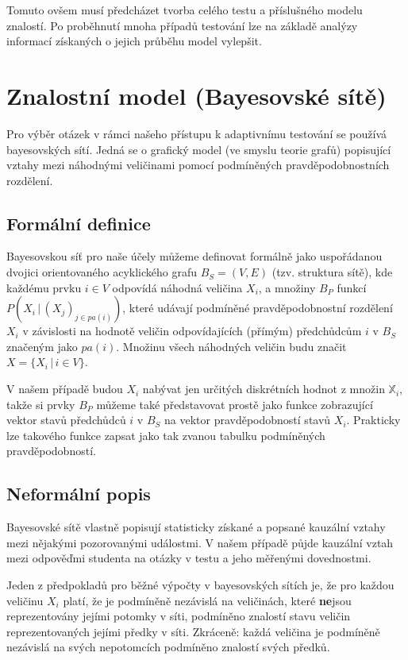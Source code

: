 \documentclass[a4paper,twoside,12pt]{book}
\begin{document}
Tomuto ovšem musí předcházet tvorba celého testu a příslušného modelu znalostí. Po proběhnutí mnoha případů testování lze na základě analýzy informací získaných o jejich průběhu model vylepšit.

\chapter{Znalostní model (Bayesovské sítě)}
Pro výběr otázek v rámci našeho přístupu k adaptivnímu testování se používá bayesovských sítí. Jedná se o grafický model (ve smyslu teorie grafů) popisující vztahy mezi náhodnými veličinami pomocí podmíněných pravděpodobnostních rozdělení.

\section{Formální definice}
Bayesovskou síť pro naše účely můžeme definovat formálně jako uspořádanou dvojici orientovaného acyklického grafu $B_S = (V,E)$ (tzv. struktura sítě), kde každému prvku $i \in V$ odpovídá náhodná veličina $X_i$, a množiny $B_P$  funkcí $P(X_i\,|\,(X_j)_{j\in pa(i)})$, které udávají podmíněné pravděpodobnostní rozdělení $X_i$ v závislosti na hodnotě veličin odpovídajících (přímým) předchůdcům $i$ v $B_S$ značeným jako $pa(i)$. Množinu všech náhodných veličin budu značit $X=\{X_i\,|\,i \in V\}$.

V našem případě budou $X_i$ nabývat jen určitých diskrétních hodnot z množin $\mathbb{X}_i$, takže si prvky $B_P$ můžeme také představovat prostě jako funkce zobrazující vektor stavů předchůdců $i$ v $B_S$ na vektor pravděpodobností stavů $X_i$. Prakticky lze takového funkce zapsat jako tak zvanou tabulku podmíněných pravděpodobností.

\section{Neformální popis}
Bayesovské sítě vlastně popisují statisticky získané a popsané kauzální vztahy mezi nějakými pozorovanými událostmi. V našem případě půjde kauzální vztah mezi odpověďmi studenta na otázky v testu a jeho měřenými dovednostmi.

Jeden z předpokladů pro běžné výpočty v bayesovských sítích je, že pro každou veličinu $X_i$ platí, že je podmíněně nezávislá na veličinách, které  \textbf{ne}jsou reprezentovány jejími potomky v síti, podmíněno znalostí stavu veličin reprezentovaných jejími předky v síti. Zkráceně: každá veličina je podmíněně nezávislá na svých nepotomcích podmíněno znalostí svých předků.
\end{document}
